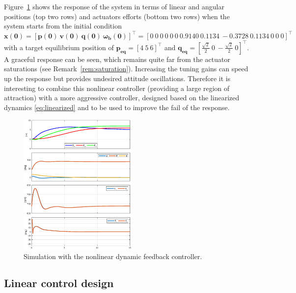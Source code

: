 Figure~\ref{fig_global_contol} shows the response of the system in terms of linear and angular positions (top two rows) and actuators efforts (bottom two rows) when the system starts from the initial condition  $\boldsymbol{x(0)} = [\boldsymbol{p(0)}~ \boldsymbol{v(0)}~ \boldsymbol{q(0)}~ \boldsymbol{\omega_b(0)}]^\top = [0~0~0 ~ 0~0~0 ~0.9140 ~0.1134~ -0.3728~ 0.1134~ 0~ 0~ 0]^\top $ with a target equilibrium position of $\boldsymbol{p_{\text{eq}}} = [4~5~6]^\top$ and $\boldsymbol{q_{\text{eq}}} = [\frac{\sqrt{2}}{2}~0~-\frac{\sqrt{2}}{2}~0]^\top$. 
A graceful response can be seen, which remains quite far from the actuator saturations (see Remark~\ref{rem:saturation}). Increasing the tuning gains can speed up the response but provides undesired attitude oscillations. Therefore it is interesting to combine this nonlinear controller (providing a large region of attraction) with a more aggressive controller, designed based on the linearized dynamics \eqref{eq:linearized} and to be used to improve the fail of the response.
\begin{figure}[ht!]
    \centering
    \includegraphics[trim=0cm 0.6cm 0cm 0.6cm,clip,width=1\columnwidth, height=7cm]{figures/global2.eps}
    \vspace*{-6mm}
    \caption{Simulation with the nonlinear dynamic feedback controller.}
    \label{fig_global_contol}
\end{figure}
\subsection{Linear control design}


